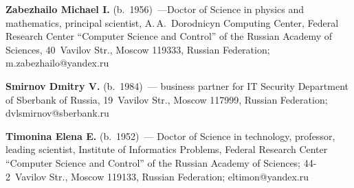 \vspace*{3pt}

\noindent
\textbf{Zabezhailo Michael I.} (b.\ 1956)~---Doctor of Science in physics and mathematics, principal 
scientist, A.\,A.~Dorodnicyn Computing Center, Federal Research Center ``Computer Science and Control'' 
of the Russian Academy of Sciences, 40~Vavilov Str., Moscow 119333, Russian Federation; 
\mbox{m.zabezhailo@yandex.ru}


\vspace*{3pt}

\noindent
\textbf{Smirnov Dmitry V.} (b.\ 1984)~--- business partner for IT Security Department of Sberbank of 
Russia, 19~Vavilov Str., Moscow 117999, Russian Federation; \mbox{dvlsmirnov@sberbank.ru}

\vspace*{3pt}

\noindent
\textbf{Timonina Elena E.} (b.\ 1952)~--- Doctor of Science in technology, professor, leading scientist, 
Institute of Informatics Problems, Federal Research Center ``Computer Science and Control'' of the Russian 
Academy of Sciences; 44-2~Vavilov Str., Moscow 119133, Russian Federation; \mbox{eltimon@yandex.ru}



\label{end\stat}

\renewcommand{\bibname}{\protect\rm Литература} 